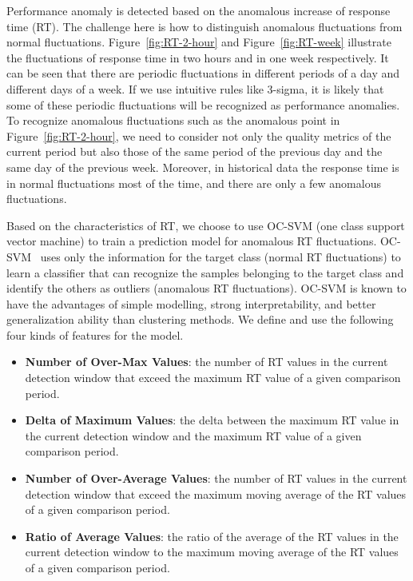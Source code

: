 Performance anomaly is detected based on the anomalous increase of response time (RT).
The challenge here is how to distinguish anomalous fluctuations from normal fluctuations. 
Figure~\ref{fig:RT-2-hour} and Figure~\ref{fig:RT-week}  illustrate the fluctuations of response time in two hours and in one week respectively.
It can be seen that there are periodic fluctuations in different periods of a day and different days of a week.
If we use intuitive rules like 3-sigma, it is likely that some of these periodic fluctuations will be recognized as performance anomalies.
To recognize anomalous fluctuations such as the anomalous point in Figure~\ref{fig:RT-2-hour}, we need to consider not only the quality metrics of the current period but also those of the same period of the previous day and the same day of the previous week.
Moreover, in historical data the response time is in normal fluctuations most of the time, and there are only a few anomalous fluctuations.

Based on the characteristics of RT, we choose to use OC-SVM (one class support vector machine) to train a prediction model for anomalous RT fluctuations.
OC-SVM~\cite{ocsvm} uses only the information for the target class (normal RT fluctuations) to learn a classifier that can recognize the samples belonging to the target class and identify the others as outliers (anomalous RT fluctuations).
OC-SVM is known to have the advantages of simple modelling, strong interpretability, and better generalization ability than clustering methods.
We define and use the following four kinds of features for the model.

\begin{itemize}
\item \textbf{Number of Over-Max Values}: the number of RT values in the current detection window that exceed the maximum RT value of a given comparison period.

\item \textbf{Delta of Maximum Values}: the delta between the maximum RT value in the current detection window and the maximum RT value of a given comparison period.

\item \textbf{Number of Over-Average Values}: the number of RT values in the current detection window that exceed the maximum moving average of the RT values of a given comparison period.

\item \textbf{Ratio of Average Values}: the ratio of the average of the RT values in the current detection window to the maximum moving average of the RT values of a given comparison period.
\end{itemize}

